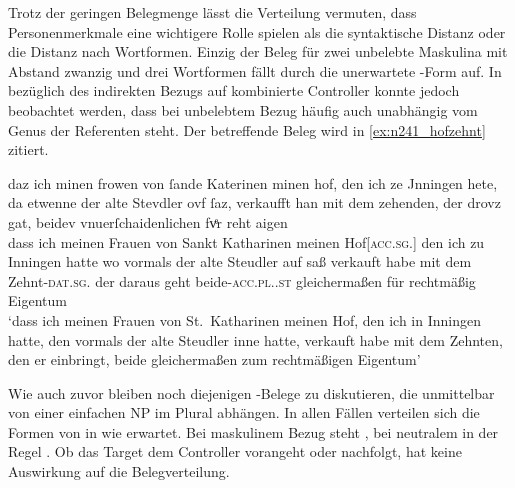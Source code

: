 Trotz der geringen Belegmenge lässt die Verteilung vermuten, dass
Personenmerkmale eine wichtigere Rolle spielen als die syntaktische Distanz
oder die Distanz nach Wortformen. Einzig der Beleg für zwei unbelebte Maskulina
mit Abstand zwanzig und drei Wortformen fällt durch die unerwartete
-Form auf. In  bezüglich des
indirekten Bezugs auf kombinierte Controller konnte jedoch beobachtet werden,
dass bei unbelebtem Bezug häufig auch unab\-hängig vom Genus der Referenten
 steht. Der betreffende Beleg wird in \cref{ex:n241_hofzehnt}
zitiert.

\begin{exe}
\ex\label{ex:n241_hofzehnt}
	\setlength{\glossglue}{5pt plus 2pt minus 1pt}
	\gll daz ich minen frowen von ſande Katerinen minen hof, den ich ze
			Jnningen hete, da etwenne der alte Stevdler ovf ſaz, verkaufft han
			mit dem zehenden, der drovz gat, beidev vnuerſchaidenlichen fvͤr
			reht aigen \\
		dass ich meinen Frauen von Sankt Katharinen meinen
			Hof[\textsc{acc.sg.\MascI}] den ich zu Inningen hatte wo vormals
			der alte Steudler auf saß verkauft habe mit dem
			Zehnt-\textsc{dat.sg.\MascI} der daraus geht
			beide-\textsc{acc.pl.\NeutI.st} gleichermaßen für rechtmäßig
			Eigentum \\
	\trans `dass ich meinen Frauen von St.~Katharinen meinen Hof, den ich
		in Inningen hatte, den vormals der alte Steudler inne hatte, verkauft
		habe  mit dem Zehnten, den er einbringt, beide
		gleichermaßen zum rechtmäßigen Eigentum'
		\parencites(Nr.~N~241, Mainau und Konstanz, 1275)[195,37--38]{cao5}
\end{exe}

Wie auch zuvor bleiben noch diejenigen -Belege zu diskutieren,
die unmittelbar von einer einfachen NP im Plural abhängen. In allen Fällen
verteilen sich die Formen von  in
 wie erwartet. Bei maskulinem Bezug steht ,
bei neutralem in der Regel . Ob das Target dem Controller
vorangeht oder nachfolgt, hat keine Auswirkung auf die Beleg\-verteilung.

